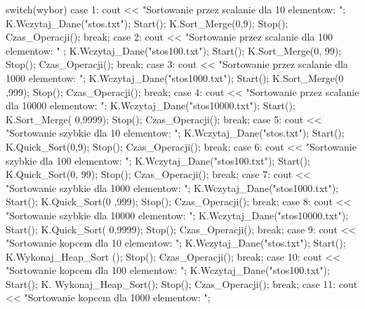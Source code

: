 \begin{DoxyCode}
{        switch(wybor)
        {
                case 1: 
                        cout << "Sortowanie przez scalanie dla 10 elementow: ";
                        K.Wczytaj_Dane("stos.txt"); Start(); K.Sort_Merge(0,9);
       Stop(); Czas_Operacji();
                        break;
                case 2: 
                        cout << "Sortowanie przez scalanie dla 100 elementow: "
      ;
                        K.Wczytaj_Dane("stos100.txt"); Start(); K.Sort_Merge(0,
      99); Stop(); Czas_Operacji();                    
                        break;
                case 3:
                        cout << "Sortowanie przez scalanie dla 1000 elementow: 
      ";
                        K.Wczytaj_Dane("stos1000.txt"); Start(); K.Sort_Merge(0
      ,999); Stop(); Czas_Operacji();
                        break;
                case 4:
                        cout << "Sortowanie przez scalanie dla 10000 elementow:
       ";
                        K.Wczytaj_Dane("stos10000.txt"); Start(); K.Sort_Merge(
      0,9999); Stop(); Czas_Operacji();
                        break;
                case 5: 
                        cout << "Sortowanie szybkie dla 10 elementow: ";
                        K.Wczytaj_Dane("stos.txt"); Start(); K.Quick_Sort(0,9);
       Stop(); Czas_Operacji();
                        break;
                case 6: 
                        cout << "Sortowanie szybkie dla 100 elementow: ";
                        K.Wczytaj_Dane("stos100.txt"); Start(); K.Quick_Sort(0,
      99); Stop(); Czas_Operacji();
                        break;
                case 7: 
                        cout << "Sortowanie szybkie dla 1000 elementow: ";
                        K.Wczytaj_Dane("stos1000.txt"); Start(); K.Quick_Sort(0
      ,999); Stop(); Czas_Operacji();
                        break;
                case 8: 
                        cout << "Sortowanie szybkie dla 10000 elementow: ";
                        K.Wczytaj_Dane("stos10000.txt"); Start(); K.Quick_Sort(
      0,9999); Stop(); Czas_Operacji();
                        break;  
                case 9: 
                        cout << "Sortowanie kopcem dla 10 elementow: ";
                        K.Wczytaj_Dane("stos.txt"); Start(); K.Wykonaj_Heap_Sort
      (); Stop(); Czas_Operacji();
                        break;
                case 10: 
                        cout << "Sortowanie kopcem dla 100 elementow: ";
                        K.Wczytaj_Dane("stos100.txt"); Start(); K.
      Wykonaj_Heap_Sort(); Stop(); Czas_Operacji();
                        break;  
                case 11: 
                        cout << "Sortowanie kopcem dla 1000 elementow: ";
}}
\end{DoxyCode}
